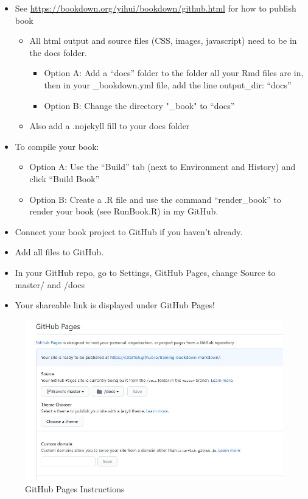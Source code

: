\documentclass[
]{book}
\providecommand{\tightlist}{%
  \setlength{\itemsep}{0pt}\setlength{\parskip}{0pt}}
\begin{document}
\begin{itemize}
\tightlist
\item
  See \url{https://bookdown.org/yihui/bookdown/github.html} for how to publish book

  \begin{itemize}
  \tightlist
  \item
    All html output and source files (CSS, images, javascript) need to be in the docs folder.

    \begin{itemize}
    \tightlist
    \item
      Option A: Add a ``docs'' folder to the folder all your Rmd files are in, then in your \_bookdown.yml file, add the line output\_dir: ``docs''
    \item
      Option B: Change the directory "\_book" to ``docs''
    \end{itemize}
  \item
    Also add a .nojekyll fill to your docs folder
  \end{itemize}
\item
  To compile your book:

  \begin{itemize}
  \tightlist
  \item
    Option A: Use the ``Build'' tab (next to Environment and History) and click ``Build Book''
  \item
    Option B: Create a .R file and use the command ``render\_book'' to render your book (see RunBook.R) in my GitHub.
  \end{itemize}
\item
  Connect your book project to GitHub if you haven't already.
\item
  Add all files to GitHub.
\item
  In your GitHub repo, go to Settings, GitHub Pages, change Source to master/ and /docs
\item
  Your shareable link is displayed under GitHub Pages!
\end{itemize}

\begin{figure}
\centering
\includegraphics{GitHubSite.jpg}
\caption{GitHub Pages Instructions}
\end{figure}
\end{document}
